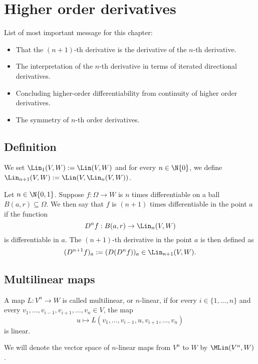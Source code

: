 \section{Higher order derivatives}
List of most important message for this chapter:
\begin{itemize}
    \item That the $(n+1)$-th derivative is the derivative of the $n$-th derivative.
    \item The interpretation of the $n$-th derivative in terms of iterated directional derivatives.
    \item Concluding higher-order differentiability from continuity of higher order derivatives.
    \item The symmetry of $n$-th order derivatives.
\end{itemize}

\subsection{Definition}
\begin{definition}
    We set $\Lin_1(V,W):= \Lin(V,W)$ and for every $n \in \N \{0\}$, we define
    $\Lin_{n+1}(V,W):=\Lin(V, \Lin_n(V,W))$.
\end{definition}

\begin{definition}
    Let $n \in \N \{0,1\}$. Suppose $f: \Omega \to W$ is $n$ times differentiable on a ball $B(a,r) \subseteq \Omega$.
    We then say that $f$ is $(n+1)$ times differentiable in the point $a$ if the function
    $$D^nf:B(a,r) \to \Lin_n(V,W)$$
    is differentiable in $a$. The $(n+1)$-th derivative in the point $a$ is then defined as
    $$(D^{n+1}f)_a := (D(D^nf))_a \in \Lin_{n+1}(V,W).$$
\end{definition}

\subsection{Multilinear maps}
\begin{definition}
    A map $L: V^n \to W$ is called multilinear, or $n$-linear, if for every $i \in \{1,\dots,n\}$
    and every $v_1,\dots,v_{i-1},v_{i+1},\dots,v_n \in V$, the map
    $$u \mapsto L(v_1,\dots,v_{i-1},u,v_{i+1},\dots,v_n)$$
    is linear.

    We will denote the vector space of $n$-linear maps from $V^n$ to $W$ by $\MLin(V^n,W)$.
\end{definition}

